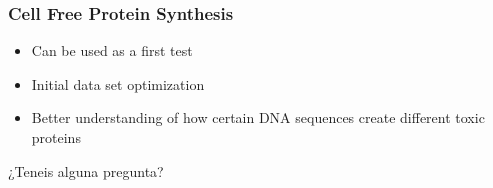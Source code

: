 \documentclass[11pt]{beamer}
\begin{document}
	\begin{frame}
		\frametitle{Cell Free Protein Synthesis}
		\begin{itemize}
			\item Can be used as a first test
			\item Initial data set optimization
			\item Better understanding of how certain DNA sequences create different toxic proteins
		\end{itemize}
	\end{frame}
	\begin{frame}[c,plain]
		\centering
		\Huge ¿Teneis alguna pregunta?
	\end{frame}
\end{document}
